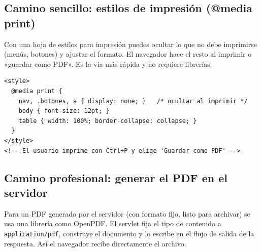 \documentclass[11pt]{article}
\begin{document}
\subsection{Camino sencillo: estilos de impresión (@media print)}
Con una hoja de estilos para impresión puedes ocultar lo que no debe imprimirse (menús, botones) y ajustar el formato. El navegador hace el resto al imprimir o «guardar como PDF». Es la vía más rápida y no requiere librerías.

\begin{cajacodigo}
\begin{lstlisting}[style=markup]
<style>
  @media print {
    nav, .botones, a { display: none; }   /* ocultar al imprimir */
    body { font-size: 12pt; }
    table { width: 100%; border-collapse: collapse; }
  }
</style>
<!-- El usuario imprime con Ctrl+P y elige 'Guardar como PDF' -->
\end{lstlisting}
\end{cajacodigo}
\vspace{2pt}
\subsection{Camino profesional: generar el PDF en el servidor}
Para un PDF generado por el servidor (con formato fijo, listo para archivar) se usa una librería como OpenPDF. El servlet fija el tipo de contenido a \texttt{application/\allowbreak{}pdf}, construye el documento y lo escribe en el flujo de salida de la respuesta. Así el navegador recibe directamente el archivo.
\end{document}
